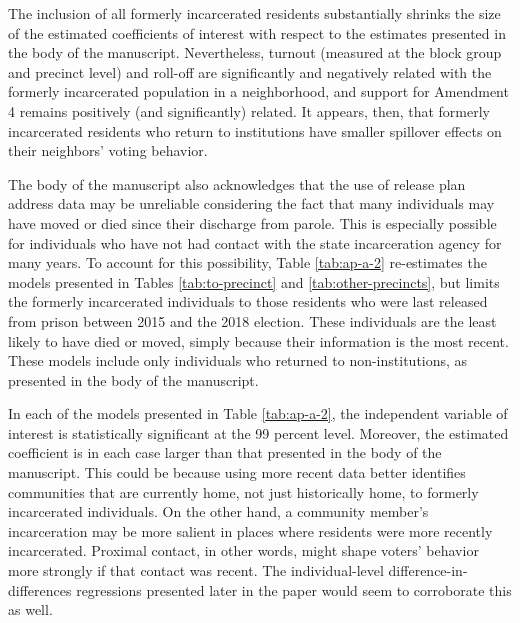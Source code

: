\documentclass[
  12pt,
]{article}
\begin{document}
\begin{singlespace}


\end{singlespace}

The inclusion of all formerly incarcerated residents substantially shrinks the size of the estimated coefficients of interest with respect to the estimates presented in the body of the manuscript. Nevertheless, turnout (measured at the block group and precinct level) and roll-off are significantly and negatively related with the formerly incarcerated population in a neighborhood, and support for Amendment 4 remains positively (and significantly) related. It appears, then, that formerly incarcerated residents who return to institutions have smaller spillover effects on their neighbors' voting behavior.

The body of the manuscript also acknowledges that the use of release plan address data may be unreliable considering the fact that many individuals may have moved or died since their discharge from parole. This is especially possible for individuals who have not had contact with the state incarceration agency for many years. To account for this possibility, Table \ref{tab:ap-a-2} re-estimates the models presented in Tables \ref{tab:to-precinct} and \ref{tab:other-precincts}, but limits the formerly incarcerated individuals to those residents who were last released from prison between 2015 and the 2018 election. These individuals are the least likely to have died or moved, simply because their information is the most recent. These models include only individuals who returned to non-institutions, as presented in the body of the manuscript.

\begin{singlespace}


\end{singlespace}

In each of the models presented in Table \ref{tab:ap-a-2}, the independent variable of interest is statistically significant at the 99 percent level. Moreover, the estimated coefficient is in each case larger than that presented in the body of the manuscript. This could be because using more recent data better identifies communities that are currently home, not just historically home, to formerly incarcerated individuals. On the other hand, a community member's incarceration may be more salient in places where residents were more recently incarcerated. Proximal contact, in other words, might shape voters' behavior more strongly if that contact was recent. The individual-level difference-in-differences regressions presented later in the paper would seem to corroborate this as well.
\end{document}
